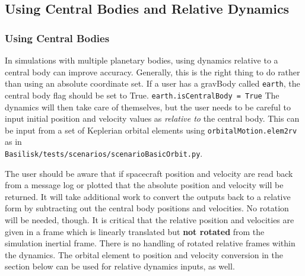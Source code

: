 \subsection{Using Central Bodies and Relative Dynamics}
\subsubsection{Using Central Bodies}
In simulations with multiple planetary bodies, using dynamics relative to a central body can improve accuracy. Generally, this is the right thing to do rather than using an absolute coordinate set. If a user has a gravBody called \verb|earth|, the central body flag should be set to True.
\verb|earth.isCentralBody = True|	
The dynamics will then take care of themselves, but the user needs to be careful to input initial position and velocity values as \textit{relative to} the central body. This can be input from a set of Keplerian orbital elements using \verb|orbitalMotion.elem2rv| as in\\ \verb|Basilisk/tests/scenarios/scenarioBasicOrbit.py|. 

The user should be aware that if spacecraft position and velocity are read back from a message log or plotted that the absolute position and velocity will be returned. It will take additional work to convert the outputs back to a relative form by subtracting out the central body positions and velocities. No rotation will be needed, though.
It is critical that the relative position and velocities are given in a frame which is linearly translated but \textbf{not rotated} from the simulation inertial frame. There is no handling of rotated relative frames within the dynamics. The orbital element to position and velocity conversion in the section below can be used for relative dynamics inputs, as well.

